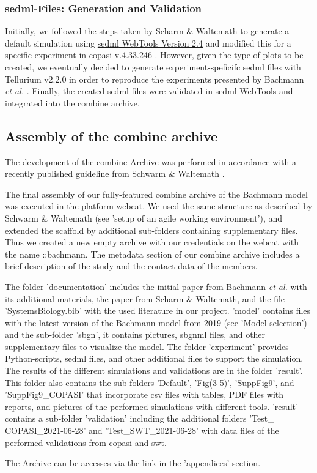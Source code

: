 \subsubsection*{\acs{sedml}-Files: Generation and Validation}
Initially, we followed the steps taken by Scharm \& Waltemath \cite{combine} to generate a default simulation using \hyperlink{http://sysbioapps.spdns.org/SED-ML_Web_Tools}{\acs{sedml} WebTools Version 2.4} and modified this for a specific experiment in \hyperlink{http://copasi.org/}{\ac{copasi}} v.4.33.246 \cite{copasi}. However, given the type of plots to be created, we eventually decided to generate experiment-speficifc \ac{sedml} files with Tellurium v2.2.0 \cite{tellurium} in order to reproduce the experiments presented by Bachmann \textit{et al.} \cite{bachmannmodel}. Finally, the created \ac{sedml} files were validated in \ac{sedml} WebTools and integrated into the \ac{combine} archive.

\subsection*{Assembly of the \acs{combine} archive}

The development of the \ac{combine} Archive was performed in accordance with a recently published guideline from Schwarm \& Waltemath \cite{combine}.

The final assembly of our fully-featured \ac{combine} archive of the Bachmann model was executed in the platform \ac{webcat}. We used the same structure as described by Schwarm \& Waltemath (see 'setup of an agile working environment'), and extended the scaffold by additional sub-folders containing supplementary files. Thus we created a new empty archive with our credentials on the \ac{webcat} with the name \textsf{::bachmann}. The metadata section of our \ac{combine} archive includes a brief description of the study and the contact data of the members.

The folder 'documentation' includes the initial paper from Bachmann \textit{et al.}  with its additional materials, the paper from Scharm \& Waltemath, and the file 'SystemsBiology.bib' with the used literature in our project. 'model' contains files with the latest version of the Bachmann model from 2019 (see 'Model selection') and the sub-folder 'sbgn', it contains pictures, \ac{sbgnml} files, and other supplementary files to visualize the model. The folder 'experiment' provides Python-scripts, \ac{sedml} files, and other additional files to support the simulation. The results of the different simulations and validations are in the folder 'result'. This folder also contains the sub-folders 'Default', 'Fig(3-5)', 'SuppFig9', and 'SuppFig9\_COPASI' that incorporate \ac{csv} files with tables, PDF files with reports, and pictures of the performed simulations with different tools.  'result' contains a sub-folder 'validation'  including the additional folders 'Test\_ COPASI\_2021-06-28' and 'Test\_SWT\_2021-06-28' with data files of the performed validations from \ac{copasi} and \ac{swt}.

The Archive can be accesses via the link in the 'appendices'-section.